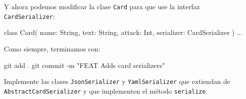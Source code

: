   Y ahora podemos modificar la clase \texttt{Card} para que use la interfaz \texttt{CardSerializer}:

  \begin{kotlin}
    class Card(
      name: String, text: String, attack: Int,
      serializer: CardSerializer
    ) {...}
  \end{kotlin}

  Como siempre, terminamos con:

  \begin{powershell}
    git add .
    git commit -m "FEAT Adds card serializers"
  \end{powershell}

  \begin{exercise}
    Implemente las clases \texttt{JsonSerializer} y \texttt{YamlSerializer} que extiendan de
    \texttt{AbstractCardSerializer} y que implementen el método \texttt{serialize}.
  \end{exercise}